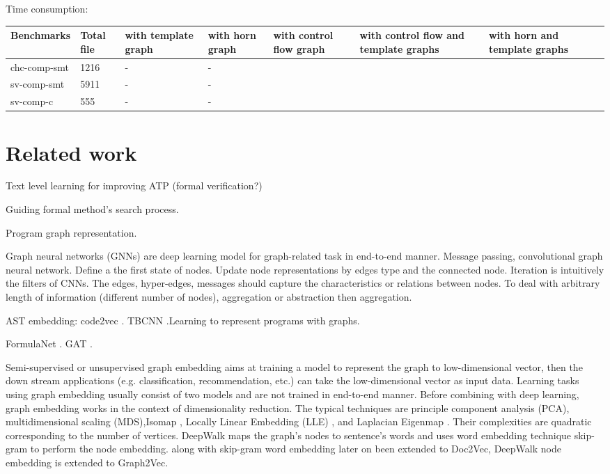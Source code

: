 \documentclass{article}
\begin{document}
Time consumption:
\begin{center}
\begin{tabular}{lp{1cm}p{1cm}p{1cm}p{1cm}p{1cm}p{1cm}p{1cm} }
\hline
Benchmarks  & Total file & with template graph & with horn graph & with control flow graph &with control flow and template graphs & with horn and template graphs\\
\hline
chc-comp-smt  & 1216 & -&-\\
sv-comp-smt  & 5911 & -&-\\
sv-comp-c  & 555 & -&-\\
\hline
\end{tabular}
\end{center}

\section{Related work}

Text level learning for improving ATP (formal verification?) \cite{NIPS2016_6280}

Guiding formal method's search process.

Program graph representation.

Graph neural networks (GNNs) are deep learning model for graph-related task in end-to-end manner. Message passing, convolutional graph neural network.
Define a the first state of nodes. Update node representations by edges type and the connected node. Iteration is intuitively the filters of CNNs.
The edges, hyper-edges, messages should capture the characteristics or relations between nodes.
To deal with arbitrary length of information (different number of nodes), aggregation or abstraction then aggregation.

AST embedding: code2vec \cite{Alon:2019:CLD:3302515.3290353}. TBCNN \cite{DBLP:journals/corr/MouLJZW14}.Learning to represent programs with graphs\cite{DBLP:journals/corr/abs-1711-00740}.


FormulaNet \cite{NIPS2017_6871}. GAT \cite{2017arXiv171010903V}.

Semi-supervised or unsupervised graph embedding aims at training a model to represent the graph to low-dimensional vector, then the down stream applications (e.g. classification, recommendation, etc.) can take the low-dimensional vector as input data. Learning tasks using graph embedding usually consist of two models and are not trained in end-to-end manner.
Before combining with deep learning, graph embedding works in the context of dimensionality reduction.
The typical techniques are principle component analysis (PCA), multidimensional scaling (MDS),Isomap \cite{Isomap}, Locally Linear Embedding (LLE) \cite{Roweis2323}, and Laplacian Eigenmap \cite{NIPS2001_1961}. Their complexities are quadratic corresponding to the number of vertices.
DeepWalk maps the graph's nodes to sentence's words and uses word embedding technique skip-gram to perform the node embedding. along with skip-gram word embedding later on been extended to Doc2Vec, DeepWalk node embedding is extended to Graph2Vec.
\end{document}
